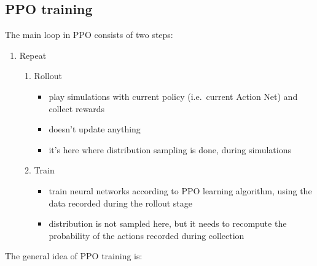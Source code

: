 \documentclass[
  letterpaper,
  DIV=11,
  numbers=noendperiod]{scrartcl}
\providecommand{\tightlist}{%
  \setlength{\itemsep}{0pt}\setlength{\parskip}{0pt}}\usepackage{longtable,booktabs,array}
\begin{document}
\subsection{PPO training}\label{ppo-training}

The main loop in PPO consists of two steps:

\begin{enumerate}
\def\labelenumi{\arabic{enumi}.}
\tightlist
\item
  Repeat

  \begin{enumerate}
  \def\labelenumii{\arabic{enumii}.}
  \tightlist
  \item
    Rollout

    \begin{itemize}
    \tightlist
    \item
      play simulations with current policy (i.e.~current Action Net) and
      collect rewards
    \item
      doesn't update anything
    \item
      it's here where distribution sampling is done, during simulations
    \end{itemize}
  \item
    Train

    \begin{itemize}
    \tightlist
    \item
      train neural networks according to PPO learning algorithm, using
      the data recorded during the rollout stage
    \item
      distribution is not sampled here, but it needs to recompute the
      probability of the actions recorded during collection
    \end{itemize}
  \end{enumerate}
\end{enumerate}

The general idea of PPO training is:
\end{document}
